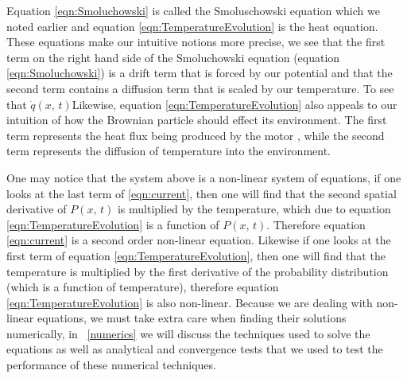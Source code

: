 Equation \ref{eqn:Smoluchowski} is called the Smoluschowski equation which we noted earlier and equation \ref{eqn:TemperatureEvolution} is the heat equation. These equations make our intuitive notions more precise, we see that the first term on the right hand side of the Smoluchowski equation (equation \ref{eqn:Smoluchowski}) is a drift term that is forced by our potential and that the second term contains a diffusion term that is scaled by our temperature. To see that $\dot{q}(x, \, t)$Likewise, equation \ref{eqn:TemperatureEvolution} also appeals to our intuition of how the Brownian particle should effect its environment. The first term represents the heat flux being produced by the motor \cite{M.W.Jack2016}, while the second term represents the diffusion of temperature into the environment.

One may notice that the system above is a non-linear system of equations, if one looks at the last term of \ref{eqn:current}, then one will find that the second spatial derivative of $P(x, \, t)$ is multiplied by the temperature, which due to equation \ref{eqn:TemperatureEvolution} is a function of $P(x, \, t)$. Therefore equation \ref{eqn:current} is a second order non-linear equation. Likewise if one looks at the first term of equation \ref{eqn:TemperatureEvolution}, then one will find that the temperature is multiplied by the first derivative of the probability distribution (which is a function of temperature), therefore equation \ref{eqn:TemperatureEvolution} is also non-linear. Because we are dealing with non-linear equations, we must take extra care when finding their solutions numerically, in ~\autoref{numerics} we will discuss the techniques used to solve the equations as well as analytical and convergence tests that we used to test the performance of these numerical techniques.

